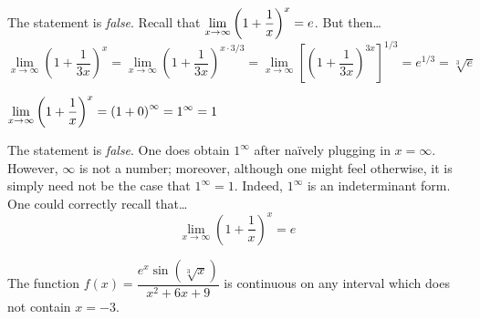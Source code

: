 \documentclass[11pt,letterpaper]{article}
\begin{document}
\sol The statement is \textit{false}. Recall that $\displaystyle\lim_{x \to \infty} \left(1 + \dfrac{1}{x} \right)^x= e$. But then\dots
	\[
	\lim_{x \to \infty} \left(1 + \dfrac{1}{3x} \right)^x= \lim_{x \to \infty} \left(1 + \dfrac{1}{3x} \right)^{x \cdot 3/3}= \lim_{x \to \infty} \left[ \left(1 + \dfrac{1}{3x} \right)^{3x} \right]^{1/3}= e^{1/3}= \sqrt[3]{e}
	\] \pvspace{1.3cm}



 $\displaystyle\lim_{x \to \infty} \left(1 + \dfrac{1}{x} \right)^x= \left(1 + 0\right)^\infty= 1^\infty= 1$ \pspace

\sol The statement is \textit{false}. One does obtain $1^\infty$ after na\"ively plugging in $x= \infty$. However, $\infty$ is not a number; moreover, although one might feel otherwise, it is simply need not be the case that $1^\infty= 1$. Indeed, $1^\infty$ is an indeterminant form. One could correctly recall that\dots
	\[
	\lim_{x \to \infty} \left(1 + \dfrac{1}{x} \right)^x= e
	\] \pvspace{1.3cm}



 The function $f(x)= \dfrac{e^x \sin(\sqrt[3]{x})}{x^2 + 6x + 9}$ is continuous on any interval which does not contain $x= -3$. \pspace

\sol 
\end{document}
